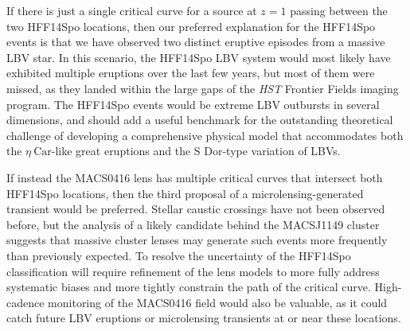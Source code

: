 \documentclass{article}
\providecommand\citep{\cite}
\def\etacar{\ensuremath{\eta~\mbox{Car}}\xspace}
\def\HST{{\it HST}\xspace}
\def\spock{HFF14Spo\xspace}
\def\macs0416{MACS0416\xspace}
\begin{document}
If there is just a single critical curve for a source at $z=1$ passing
between the two \spock locations, then our preferred explanation for
the \spock events is that we have observed two distinct eruptive
episodes from a massive LBV star. In this scenario, the \spock LBV
system would most likely have exhibited multiple eruptions over the
last few years, but most of them were missed, as they landed within
the large gaps of the \HST Frontier Fields imaging program. The \spock
events would be extreme LBV outbursts in several dimensions, and
should add a useful benchmark for the outstanding theoretical
challenge of developing a comprehensive physical model that
accommodates both the \etacar-like great eruptions and the S Dor-type
variation of LBVs.

If instead the \macs0416 lens has multiple critical curves that
intersect both \spock locations, then the third proposal of a
microlensing-generated transient would be preferred.  Stellar caustic
crossings have not been observed before, but the analysis of a likely
candidate behind the MACSJ1149 cluster\citep{Kelly:2017} suggests that massive cluster
lenses may generate such events more frequently than previously
expected\citep{Kelly:2017, Diego:2017}. To resolve the uncertainty of
the \spock classification will require refinement of the lens models
to more fully address systematic biases and more tightly constrain the
path of the critical curve.  High-cadence monitoring of the \macs0416
field would also be valuable, as it could catch future LBV eruptions
or microlensing transients at or near these locations.

\end{document}
